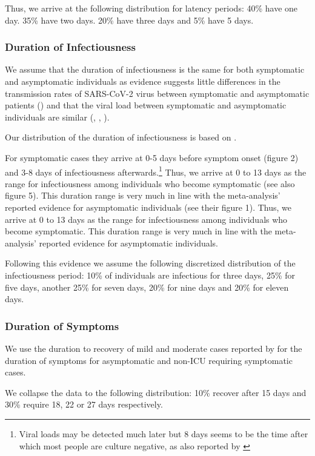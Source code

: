 Thus, we arrive at the following distribution for latency periods: 40\% have one day. 35\% have two days. 20\% have three days and 5\% have 5 days.


\subsubsection{Duration of Infectiousness}

We assume that the duration of infectiousness is the same for both symptomatic and asymptomatic individuals as evidence suggests little differences in the transmission rates of SARS-CoV-2 virus between symptomatic and asymptomatic patients (\citet{Yin2020}) and that the viral load between symptomatic and asymptomatic individuals are similar (\citet{Zou2020}, \citet{Byrne2020}, \citet{Singanayagam2020}).

Our distribution of the duration of infectiousness is based on \citet{Byrne2020}.

For symptomatic cases they arrive at 0-5 days before symptom onset (figure 2) and 3-8 days of infectiousness afterwards.\footnote{Viral loads may be detected much later but 8 days seems to be the time after which most people are culture negative, as also reported by \citet{Singanayagam2020}} Thus, we arrive at 0 to 13 days as the range for infectiousness among individuals who become symptomatic (see also figure 5). This duration range is very much in line with the meta-analysis’ reported evidence for asymptomatic individuals (see their figure 1). Thus, we arrive at 0 to 13 days as the range for infectiousness among individuals who become symptomatic. This duration range is very much in line with the meta-analysis' reported evidence for asymptomatic individuals.

Following this evidence we assume the following discretized distribution of the infectiousness period: 10\% of individuals are infectious for three days, 25\% for five days, another 25\% for seven days, 20\% for nine days and 20\% for eleven days.


\subsubsection{Duration of Symptoms}

We use the duration to recovery of mild and moderate cases reported by \cite[Figure~S3, Panel~2]{Bi2020} for the duration of symptoms for asymptomatic and non-ICU requiring symptomatic cases.

We collapse the data to the following distribution: 10\% recover after 15 days and 30\% require 18, 22 or 27 days respectively.

